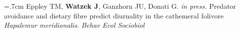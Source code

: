 \documentclass[]{friggeri-cv}
\begin{document}
\hangindent=.7cm Eppley TM, \textbf{Watzek J}, Ganzhorn JU, Donati G. \emph{in press.} Predator avoidance and dietary fibre predict diurnality in the cathemeral folivore \emph{Hapalemur meridionalis}. \emph{Behav Ecol Sociobiol} \\[-.1cm] %











\end{document}
